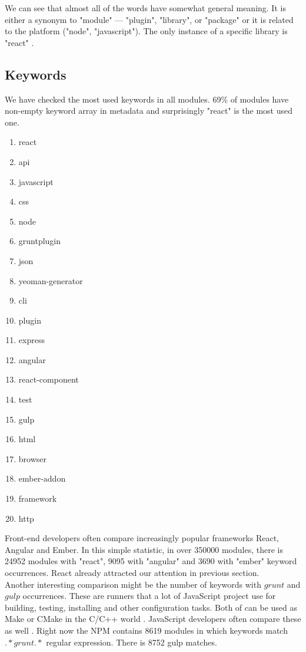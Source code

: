 \documentclass[thesis=M,english]{FITthesis}[2012/10/20]
\begin{document}
We can see that almost all of the words have somewhat general meaning. It is either a synonym to "module" — "plugin", "library", or "package" or it is related to the platform ("node", "javascript"). The only instance of a specific library is "react" \cite{react_gh}. \\

\subsection{Keywords}

We have checked the most used keywords in all modules. 69\% of modules have non-empty keyword array in metadata and surprisingly "react" is the most used one.

\begin{multicols}{2}
\begin{enumerate}
\item react
\item api
\item javascript
\item css
\item node
\item gruntplugin
\item json
\item yeoman-generator
\item cli
\item plugin
\item express
\item angular
\item react-component
\item test
\item gulp
\item html
\item browser
\item ember-addon
\item framework
\item http
\end{enumerate}
\end{multicols}


Front-end developers often compare increasingly popular frameworks React, Angular and Ember. In this simple statistic, in over 350000 modules, there is 24952 modules with "react", 9095 with "angular" and 3690 with "ember" keyword occurrences. React already attracted our attention in previous section. \\

Another interesting comparison might be the number of keywords with $grunt$ and $gulp$ occurrences. These are runners that a lot of JavaScript project use for building, testing, installing and other configuration tasks. Both of can be used as Make or CMake in the C/C++ world \cite{js_make}. JavaScript developers often compare these as well \cite{gruntgulp}. Right now the NPM contains 8619 modules in which keywords match $.*grunt.*$ regular expression. There is 8752 gulp matches.
\end{document}
